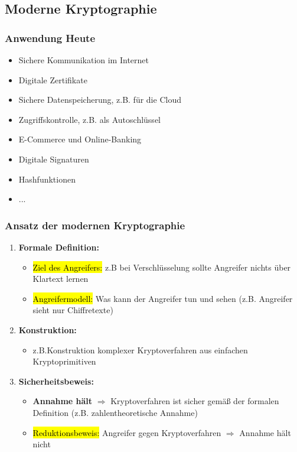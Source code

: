\documentclass[a4paper, 10pt]{article}
\begin{document}
\subsection{Moderne Kryptographie}
\subsubsection{Anwendung Heute}
\begin{itemize}
    \item Sichere Kommunikation im Internet
    \item Digitale Zertifikate
    \item Sichere Datenspeicherung, z.B. für die Cloud
    \item Zugriffskontrolle, z.B. als Autoschlüssel
    \item E-Commerce und Online-Banking
    \item Digitale Signaturen
    \item Hashfunktionen
    \item ...
\end{itemize}
\subsubsection{Ansatz der modernen Kryptographie}
\begin{enumerate}
    \item \textbf{Formale Definition:}
    \begin{itemize}
        \item \hl{Ziel des Angreifers:} z.B bei Verschlüsselung sollte Angreifer nichts über Klartext lernen
        \item \hl{Angreifermodell:} Was kann der Angreifer tun und sehen (z.B. Angreifer sieht nur Chiffretexte)
    \end{itemize}

    \item \textbf{Konstruktion:}
    \begin{itemize}
        \item z.B.Konstruktion komplexer Kryptoverfahren aus einfachen Kryptoprimitiven
    \end{itemize}

    \item \textbf{Sicherheitsbeweis:}
    \begin{itemize}
        \item \textbf{Annahme hält} $\Longrightarrow$ Kryptoverfahren ist sicher gemäß der formalen Definition (z.B. zahlentheoretische Annahme)
        \item \hl{Reduktionsbeweis:} Angreifer gegen Kryptoverfahren $\Longrightarrow$ Annahme hält nicht
    \end{itemize}
\end{enumerate}
\end{document}
